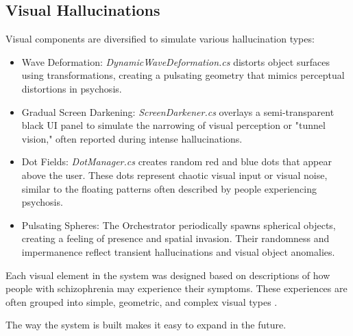     

\subsection{Visual Hallucinations}
Visual components are diversified to simulate various hallucination types:
\begin{itemize}
    \item Wave Deformation: \textit{DynamicWaveDeformation.cs} distorts object surfaces using transformations, creating a pulsating geometry that mimics perceptual distortions in psychosis.
    \item Gradual Screen Darkening: \textit{ScreenDarkener.cs} overlays a semi-transparent black UI panel to simulate the narrowing of visual perception or "tunnel vision," often reported during intense hallucinations.
    \item Dot Fields: \textit{DotManager.cs} creates random red and blue dots that appear above the user. These dots represent chaotic visual input or visual noise, similar to the floating patterns often described by people experiencing psychosis.
    \item Pulsating Spheres: The Orchestrator periodically spawns spherical objects, creating a feeling of presence and spatial invasion. Their randomness and impermanence reflect transient hallucinations and visual object anomalies.
\end{itemize}

Each visual element in the system was designed based on descriptions of how people with schizophrenia may experience their symptoms. These experiences are often grouped into simple, geometric, and complex visual types \cite{Silverstein2021,Vanommen2019}.

The way the system is built makes it easy to expand in the future.